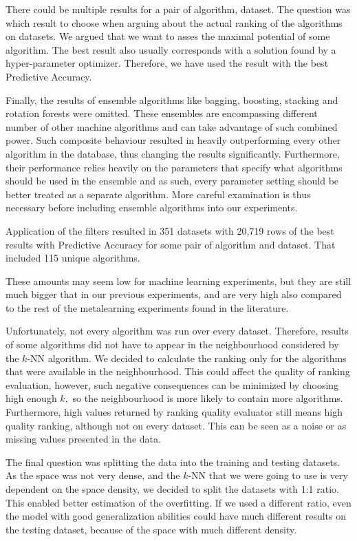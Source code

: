 There could be multiple results for a pair of algorithm, dataset. The question was which result to choose when arguing about the actual ranking of the algorithms on datasets. We argued that we want to asses the maximal potential of some algorithm. The best result also usually corresponds with a solution found by a hyper-parameter optimizer. Therefore, we have used the result with the best Predictive Accuracy.
 	
Finally, the results of ensemble algorithms like bagging, boosting, stacking and rotation forests \cite{rotationForests} were omitted. These ensembles are encompassing different number of other machine algorithms and can take advantage of such combined power. Such composite behaviour resulted in heavily outperforming every other algorithm in the database, thus changing the results significantly. Furthermore, their performance relies heavily on the parameters that specify what algorithms should be used in the ensemble and as such, every parameter setting should be better treated as a separate algorithm. More careful examination is thus necessary before including ensemble algorithms into our experiments.

Application of the filters resulted in 351 datasets with 20,719 rows of the best results with Predictive Accuracy for some pair of algorithm and dataset. That included 115 unique algorithms.

These amounts may seem low for machine learning experiments, but they are still much bigger that in our previous experiments, and are very high also compared to the rest of the metalearning experiments found in the literature.

Unfortunately, not every algorithm was run over every dataset. Therefore, results of some algorithms did not have to appear in the neighbourhood considered by the $k$-NN algorithm. We decided to calculate the ranking only for the algorithms that were available in the neighbourhood. This could affect the quality of ranking evaluation, however, such negative consequences can be minimized by choosing high enough $k,$ so the neighbourhood is more likely to contain more algorithms. Furthermore, high values returned by ranking quality evaluator still means high quality ranking, although not on every dataset. This can be seen as a noise or as missing values presented in the data.

The final question was splitting the data into the training and testing datasets. As the space was not very dense, and the $k$-NN that we were going to use is very dependent on the space density, we decided to split the datasets with 1:1 ratio. This enabled better estimation of the overfitting. If we used a different ratio, even the model with good generalization abilities could have much different results on the testing dataset, because of the space with much different density.

